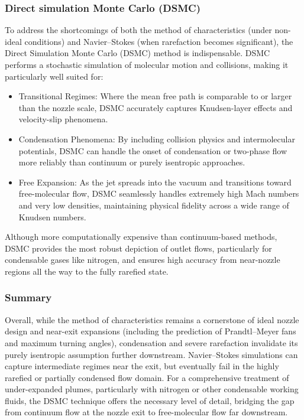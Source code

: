 \subsubsection*{Direct simulation Monte Carlo (DSMC)}
	To address the shortcomings of both the method of characteristics (under non-ideal conditions) and Navier–Stokes (when rarefaction becomes significant), the Direct Simulation Monte Carlo (DSMC) method is indispensable.
	DSMC performs a stochastic simulation of molecular motion and collisions, making it particularly well suited for:
	\begin{itemize}
		\item Transitional Regimes: Where the mean free path is comparable to or larger than the nozzle scale, DSMC accurately captures Knudsen-layer effects and velocity-slip phenomena.
		\item Condensation Phenomena: By including collision physics and intermolecular potentials, DSMC can handle the onset of condensation or two-phase flow more reliably than continuum or purely isentropic approaches. \cite{EMMONS1958}
		\item Free Expansion: As the jet spreads into the vacuum and transitions toward free-molecular flow, DSMC seamlessly handles extremely high Mach numbers and very low densities, maintaining physical fidelity across a wide range of Knudsen numbers.
	\end{itemize}
	Although more computationally expensive than continuum-based methods, DSMC provides the most robust depiction of outlet flows, particularly for condensable gases like nitrogen, and ensures high accuracy from near-nozzle regions all the way to the fully rarefied state.
	\cite{putignano2012supersonic, liu_study_2006}

\subsubsection*{Summary}
	Overall, while the method of characteristics remains a cornerstone of ideal nozzle design and near-exit expansions (including the prediction of Prandtl–Meyer fans and maximum turning angles), condensation and severe rarefaction invalidate its purely isentropic assumption further downstream.
	Navier–Stokes simulations can capture intermediate regimes near the exit, but eventually fail in the highly rarefied or partially condensed flow domain.
	For a comprehensive treatment of under-expanded plumes, particularly with nitrogen or other condensable working fluids, the DSMC technique offers the necessary level of detail, bridging the gap from continuum flow at the nozzle exit to free-molecular flow far downstream.
